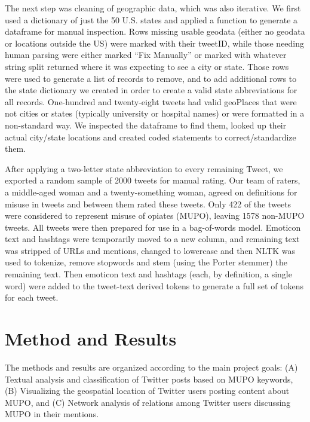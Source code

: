\documentclass[sigconf]{acmart}
\begin{document}

The next step was cleaning of geographic data, which was also iterative. We 
first used a dictionary of just the 50 U.S. states and applied a function to 
generate a dataframe for manual inspection. Rows missing usable geodata (either 
no geodata or locations outside the US) were marked with their tweetID, while 
those needing human parsing were either marked ``Fix Manually'' or marked with 
whatever string split returned where it was expecting to see a city or state. 
Those rows were used to generate a list of records to remove, and to add 
additional rows to the state dictionary we created in order to create a valid 
state abbreviations for all records. One-hundred and twenty-eight tweets had 
valid geoPlaces that were not cities or states (typically university or hospital 
names) or were formatted in a non-standard way. We inspected the dataframe to 
find them, looked up their actual city/state locations and created coded 
statements to correct/standardize them.
 
After applying a two-letter state abbreviation to every remaining Tweet, we 
exported a random sample of 2000 tweets for manual rating. Our team of raters, 
a middle-aged woman and a twenty-something woman, agreed on definitions for 
misuse in tweets and between them rated these tweets. Only 422 of the tweets 
were considered to represent misuse of opiates (MUPO), leaving 1578 non-MUPO 
tweets. All tweets were then prepared for use in a bag-of-words model. Emoticon 
text and hashtags were temporarily moved to a new column, and remaining text 
was stripped of URLs and mentions, changed to lowercase and then NLTK was used 
to tokenize, remove stopwords and stem (using the Porter stemmer) the remaining 
text. Then emoticon text and hashtags (each, by definition, a single word) were 
added to the tweet-text derived tokens to generate a full set of tokens for 
each tweet.


\section{Method and Results}
The methods and results are organized according to the main project goals: 
(A) Textual analysis and classification of Twitter posts based on MUPO keywords, 
(B) Visualizing the geospatial location of Twitter users posting content about
MUPO, and (C) Network analysis of relations among Twitter users discussing
MUPO in their mentions.  
\end{document}

